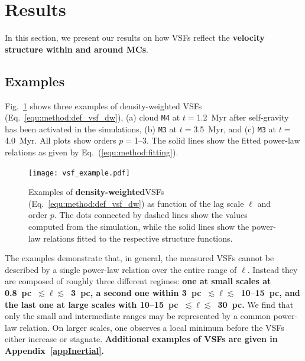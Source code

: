 \section{Results}\label{results}

In this section, we present our results on how VSFs reflect the \textbf{velocity structure within and around MCs}.

\subsection{Examples}\label{results:example}

Fig.~\ref{pic:results:vsf_example} shows three examples of density-weighted VSFs (Eq.~\ref{equ:method:def_vsf_dw}), (a) cloud \texttt{M4} at $t=$1.2~Myr after self-gravity has been activated in the simulations, (b) \texttt{M3} at $t=$3.5~Myr, and (c) \texttt{M3} at $t=$4.0~Myr.
All plots show orders $p=$1--3.
The solid lines show the fitted power-law relations as given by Eq.~(\ref{equ:method:fitting}).

\begin{figure}[!htb]
	\centering
	\texttt{[image: vsf\_example.pdf]}
	\caption{Examples of \textbf{density-weighted}VSFs (Eq.~\ref{equ:method:def_vsf_dw})  as function of the lag scale $\ell$ and order $p$. 
		The dots connected by dashed lines show the values computed from the simulation, while
		the solid lines show the power-law relations fitted to the respective structure functions.
	}
	\label{pic:results:vsf_example}
\end{figure}

The examples demonstrate that, in general, the measured VSFs cannot be described by a single power-law relation over the entire range of $\ell$.
Instead they are composed of roughly three different regimes: 
\textbf{one at small scales at 0.8~pc~$\lesssim \ell \lesssim$~3~pc, a second one within 3~pc~$\lesssim \ell \lesssim$~10--15~pc, and the last one at large scales with 10--15~pc~$\lesssim \ell \lesssim$~30~pc.}
We find that only the small and intermediate ranges may be represented by a common power-law relation.
On larger scales, one observes a local minimum before the VSFs either increase or stagnate.
\textbf{Additional examples of VSFs are given in Appendix~\ref{appInertial}.}

